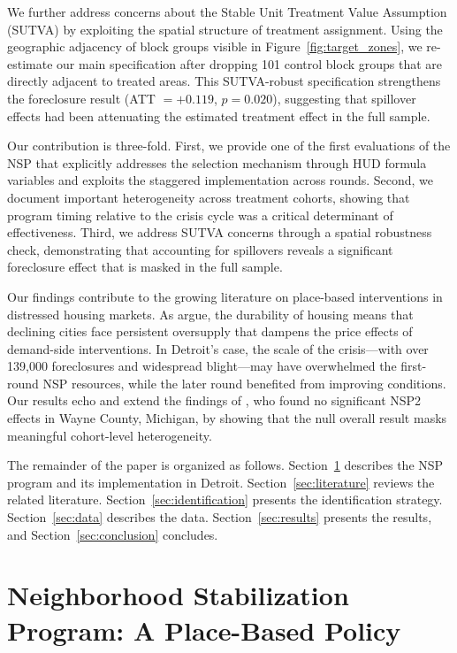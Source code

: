 \documentclass[12pt,authoryear]{elsarticle}
\begin{document}
We further address concerns about the Stable Unit Treatment Value Assumption (SUTVA) by exploiting the spatial structure of treatment assignment. Using the geographic adjacency of block groups visible in Figure~\ref{fig:target_zones}, we re-estimate our main specification after dropping 101 control block groups that are directly adjacent to treated areas. This SUTVA-robust specification strengthens the foreclosure result (ATT $= +0.119$, $p = 0.020$), suggesting that spillover effects had been attenuating the estimated treatment effect in the full sample.

Our contribution is three-fold. First, we provide one of the first evaluations of the NSP that explicitly addresses the selection mechanism through HUD formula variables and exploits the staggered implementation across rounds. Second, we document important heterogeneity across treatment cohorts, showing that program timing relative to the crisis cycle was a critical determinant of effectiveness. Third, we address SUTVA concerns through a spatial robustness check, demonstrating that accounting for spillovers reveals a significant foreclosure effect that is masked in the full sample.

Our findings contribute to the growing literature on place-based interventions in distressed housing markets. As \citet{glaeser2005} argue, the durability of housing means that declining cities face persistent oversupply that dampens the price effects of demand-side interventions. In Detroit's case, the scale of the crisis---with over 139,000 foreclosures and widespread blight---may have overwhelmed the first-round NSP resources, while the later round benefited from improving conditions. Our results echo and extend the findings of \citet{schuetz2016}, who found no significant NSP2 effects in Wayne County, Michigan, by showing that the null overall result masks meaningful cohort-level heterogeneity.

The remainder of the paper is organized as follows. Section~\ref{sec:nsp} describes the NSP program and its implementation in Detroit. Section~\ref{sec:literature} reviews the related literature. Section~\ref{sec:identification} presents the identification strategy. Section~\ref{sec:data} describes the data. Section~\ref{sec:results} presents the results, and Section~\ref{sec:conclusion} concludes.


\section{Neighborhood Stabilization Program: A Place-Based Policy}
\label{sec:nsp}
\end{document}
